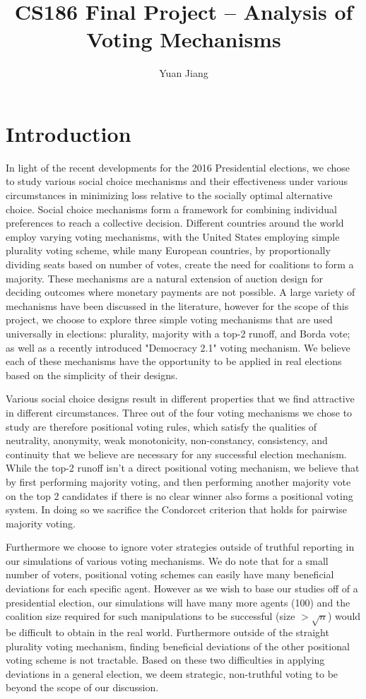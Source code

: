 \documentclass[11pt]{article}
\title{CS186 Final Project -- Analysis of Voting Mechanisms}
\author{Yuan Jiang}
\date{}                                           %
\begin{document}
\maketitle

\section*{Introduction}

In light of the recent developments for the 2016 Presidential elections, we chose to study various social choice mechanisms and their effectiveness under various circumstances in minimizing loss relative to the socially optimal alternative choice. Social choice mechanisms form a framework for combining individual preferences to reach a collective decision. Different countries around the world employ varying voting mechanisms, with the United States employing simple plurality voting scheme, while many European countries, by proportionally dividing seats based on number of votes, create the need for coalitions to form a majority. These mechanisms are a natural extension of auction design for deciding outcomes where monetary payments are not possible. A large variety of mechanisms have been discussed in the literature, however for the scope of this project, we choose to explore three simple voting mechanisms that are used universally in elections: plurality, majority with a top-2 runoff, and Borda vote; as well as a recently introduced "Democracy 2.1" voting mechanism. We believe each of these mechanisms have the opportunity to be applied in real elections based on the simplicity of their designs.

Various social choice designs result in different properties that we find attractive in different circumstances. Three out of the four voting mechanisms we chose to study are therefore positional voting rules, which satisfy the qualities of neutrality, anonymity, weak monotonicity, non-constancy, consistency, and continuity that we believe are necessary for any successful election mechanism. While the top-2 runoff isn't a direct positional voting mechanism, we believe that by first performing majority voting, and then performing another majority vote on the top 2 candidates if there is no clear winner also forms a positional voting system. In doing so we sacrifice the Condorcet criterion that holds for pairwise majority voting.

Furthermore we choose to ignore voter strategies outside of truthful reporting in our simulations of various voting mechanisms. We do note that for a small number of voters, positional voting schemes can easily have many beneficial deviations for each specific agent. However as we wish to base our studies off of a presidential election, our simulations will have many more agents (100) and the coalition size required for such manipulations to be successful (size $>\sqrt{n}$) would be difficult to obtain in the real world. Furthermore outside of the straight plurality voting mechanism, finding beneficial deviations of the other positional voting scheme is not tractable. Based on these two difficulties in applying deviations in a general election, we deem strategic, non-truthful voting to be beyond the scope of our discussion.
\end{document}
